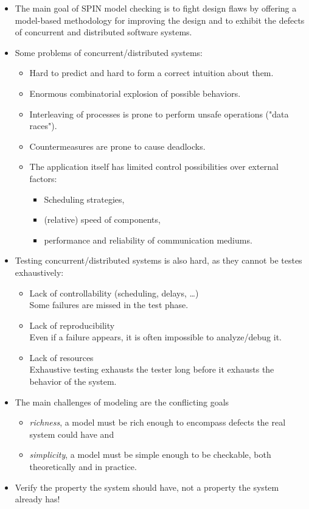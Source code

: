 	\begin{itemize}
		\item The main goal of SPIN model checking is to fight design flaws by offering a model-based methodology for improving the design and to exhibit the defects of concurrent and distributed software systems.
		\item Some problems of concurrent/distributed systems:
			\begin{itemize}
				\item Hard to predict and hard to form a correct intuition about them.
				\item Enormous combinatorial explosion of possible behaviors.
				\item Interleaving of processes is prone to perform unsafe operations ("data races").
				\item Countermeasures are prone to cause deadlocks.
				\item The application itself has limited control possibilities over external factors:
					\begin{itemize}
						\item Scheduling strategies,
						\item (relative) speed of components,
						\item performance and reliability of communication mediums.
					\end{itemize}
			\end{itemize}
		\item Testing concurrent/distributed systems is also hard, as they cannot be testes exhaustively:
			\begin{itemize}
				\item Lack of controllability (scheduling, delays, \dots) \\
				Some failures are missed in the test phase.
				\item Lack of reproducibility \\
				Even if a failure appears, it is often impossible to analyze/debug it.
				\item Lack of resources \\
				Exhaustive testing exhausts the tester long before it exhausts the behavior of the system.
			\end{itemize}
		\item The main challenges of modeling are the conflicting goals
			\begin{itemize}
				\item \textit{richness}, a model must be rich enough to encompass defects the real system could have and
				\item \textit{simplicity}, a model must be simple enough to be checkable, both theoretically and in practice.
			\end{itemize}
		\item Verify the property the system should have, not a property the system already has!
	\end{itemize}

